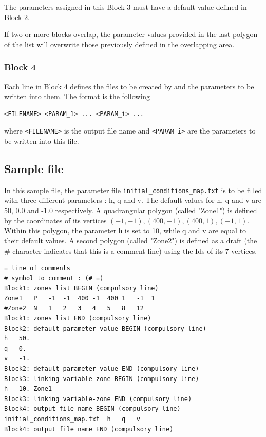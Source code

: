 The parameters assigned in this Block 3 must have a default value defined in Block 2.

If two or more blocks overlap, the parameter values provided in the last polygon of the list will overwrite those previously defined in the overlapping area. 

\subsubsection{Block 4}
Each line in Block 4 defines the files to be created by \swZone and the parameters to be written into them. The format is the following
\begin{lstlisting}
<FILENAME> <PARAM_1> ... <PARAM_i> ...
\end{lstlisting}
where \texttt{<FILENAME>} is the output file name and \texttt{<PARAM\_i>} are the parameters to be written into this file. 

\subsection{Sample file}
In this sample file, the parameter file \texttt{initial\_conditions\_map.txt} is to be filled with three different parameters : h, q and v.
The default values for h, q and v are 50, 0.0 and -1.0 respectively.
A quadrangular polygon (called "Zone1") is defined by the coordinates of its vertices $(-1,-1), (400,-1),(400,1), (-1,1)$. Within this polygon, the parameter \texttt{h} is set to 10, while q and v are equal to their default values. 
A second polygon (called "Zone2") is defined as a draft (the \# character indicates that this is a comment line) using the Ids of its 7 vertices. 

\begin{verbatim}
= line of comments
# symbol to comment : (# =)
Block1: zones list BEGIN (compulsory line)
Zone1	P	-1	-1	400	-1	400	1	-1	1
#Zone2	N	1   2   3   4   5   8   12
Block1: zones list END (compulsory line)
Block2: default parameter value BEGIN (compulsory line)
h	50.
q	0.
v	-1.
Block2: default parameter value END (compulsory line)
Block3: linking variable-zone BEGIN (compulsory line)
h	10.	Zone1
Block3: linking variable-zone END (compulsory line)
Block4: output file name BEGIN (compulsory line)
initial_conditions_map.txt  h   q   v
Block4: output file name END (compulsory line)
\end{verbatim}